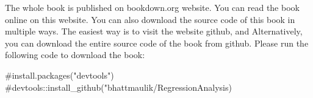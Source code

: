 \documentclass[
  letterpaper,
  twoside,
  openany]{scrbook}
\newenvironment{Shaded}{\begin{snugshade}}{\end{snugshade}}
\newcommand{\CommentTok}[1]{\textcolor[rgb]{0.37,0.37,0.37}{#1}}
\begin{document}

The whole book is published on bookdown.org website. You can read the
book online on this website. You can also download the source code of
this book in multiple ways. The easiest way is to visit the website
github, and Alternatively, you can download the entire source code of
the book from github. Please run the following code to download the
book:

\begin{Shaded}
\begin{Highlighting}[numbers=left,,]
\CommentTok{\#install.packages("devtools")}
\CommentTok{\#devtools::install\_github("bhattmaulik/RegressionAnalysis)}
\end{Highlighting}
\end{Shaded}



\backmatter
\end{document}
